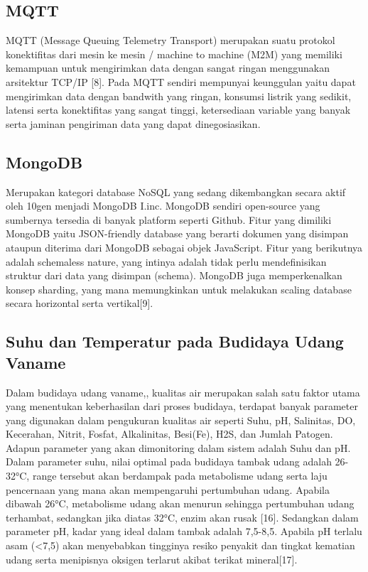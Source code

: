 \subsection{MQTT}
\label{sec:mqtt}

MQTT (Message Queuing Telemetry Transport) merupakan suatu protokol konektifitas  dari mesin ke mesin / machine to machine (M2M) yang memiliki kemampuan untuk mengirimkan data dengan sangat ringan menggunakan arsitektur TCP/IP [8]. Pada MQTT sendiri mempunyai keunggulan yaitu dapat mengirimkan data dengan bandwith yang ringan, konsumsi listrik yang sedikit, latensi serta konektifitas yang sangat tinggi, ketersediaan variable yang banyak serta jaminan pengiriman data yang dapat dinegosiasikan.

\subsection{MongoDB}
\label{sec:mongodb}

Merupakan kategori database NoSQL yang sedang dikembangkan secara aktif oleh 10gen menjadi MongoDB I.inc. MongoDB sendiri open-source yang sumbernya tersedia di banyak platform seperti Github. Fitur yang dimiliki MongoDB yaitu JSON-friendly database yang berarti dokumen yang disimpan ataupun diterima dari MongoDB sebagai objek JavaScript. Fitur yang berikutnya adalah schemaless nature, yang intinya adalah tidak perlu mendefinisikan struktur dari data yang disimpan (schema). MongoDB juga memperkenalkan konsep sharding, yang mana memungkinkan untuk melakukan scaling database secara horizontal serta vertikal[9].

\subsection{Suhu dan Temperatur pada Budidaya Udang Vaname}
\label{sec:suhudantemperatur}

Dalam budidaya udang vaname,, kualitas air merupakan salah satu faktor utama yang menentukan keberhasilan dari proses budidaya, terdapat banyak parameter yang digunakan dalam pengukuran kualitas air seperti Suhu, pH, Salinitas, DO, Kecerahan,
Nitrit, Fosfat, Alkalinitas, Besi(Fe), H2S, dan Jumlah Patogen. Adapun parameter yang akan dimonitoring dalam sistem adalah Suhu dan pH. Dalam parameter suhu, nilai optimal pada budidaya tambak udang adalah 26-32°C, range tersebut akan berdampak pada metabolisme udang serta laju pencernaan yang mana akan mempengaruhi pertumbuhan udang. Apabila dibawah 26°C, metabolisme udang akan menurun sehingga pertumbuhan udang terhambat, sedangkan jika diatas 32°C, enzim akan rusak [16]. Sedangkan dalam parameter pH, kadar yang ideal dalam tambak adalah 7,5-8,5. Apabila pH terlalu asam (<7,5) akan menyebabkan tingginya resiko penyakit dan tingkat kematian udang serta menipisnya oksigen terlarut akibat terikat mineral[17].
